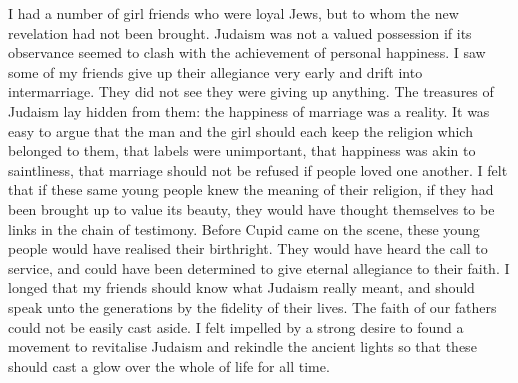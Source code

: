 I had a number of girl friends who were loyal Jews,
but to whom the new revelation had not been brought.
Judaism was not a valued possession if its observance
seemed to clash with the achievement of personal happiness.
I saw some of my friends give up their allegiance
very early and drift into intermarriage. They did not
see they were giving up anything. The treasures of
Judaism lay hidden from them: the happiness of
marriage was a reality. It was easy to argue that the
man and the girl should each keep the religion which
belonged to them, that labels were unimportant, that
happiness was akin to saintliness, that marriage should
not be refused if people loved one another. I felt that
if these same young people knew the meaning of their
religion, if they had been brought up to value its beauty,
they would have thought themselves to be links in the
chain of testimony. Before Cupid came on the scene,
these young people would have realised their birthright.
They would have heard the call to service, and could
have been determined to give eternal allegiance to their
faith. I longed that my friends should know what
Judaism really meant, and should speak unto the
generations by the fidelity of their lives. The faith of
our fathers could not be easily cast aside. I felt impelled
by a strong desire to found a movement to revitalise
Judaism and rekindle the ancient lights so that these
should cast a glow over the whole of life for all time.
